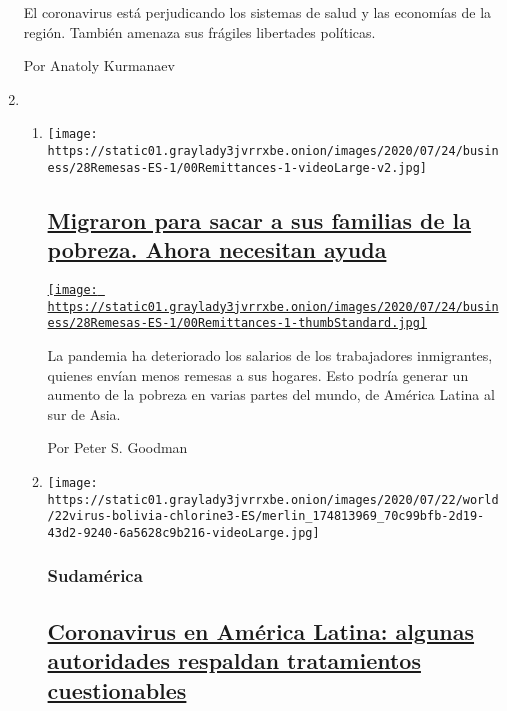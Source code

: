 \begin{enumerate}
  El coronavirus está perjudicando los sistemas de salud y las economías
  de la región. También amenaza sus frágiles libertades políticas.

  Por Anatoly Kurmanaev
\item
  \begin{enumerate}
  \def\labelenumii{\arabic{enumii}.}
  \item
    \texttt{[image: https://static01.graylady3jvrrxbe.onion/images/2020/07/24/business/28Remesas-ES-1/00Remittances-1-videoLarge-v2.jpg]}

    \hypertarget{migraron-para-sacar-a-sus-familias-de-la-pobreza-ahora-necesitan-ayuda}{%
    \subsection{\texorpdfstring{\href{/es/2020/07/28/espanol/mundo/remesas-coronavirus.html}{Migraron
    para sacar a sus familias de la pobreza. Ahora necesitan
    ayuda}}{Migraron para sacar a sus familias de la pobreza. Ahora necesitan ayuda}}\label{migraron-para-sacar-a-sus-familias-de-la-pobreza-ahora-necesitan-ayuda}}

    \href{/es/2020/07/28/espanol/mundo/remesas-coronavirus.html}{\texttt{[image: https://static01.graylady3jvrrxbe.onion/images/2020/07/24/business/28Remesas-ES-1/00Remittances-1-thumbStandard.jpg]}}

    La pandemia ha deteriorado los salarios de los trabajadores
    inmigrantes, quienes envían menos remesas a sus hogares. Esto podría
    generar un aumento de la pobreza en varias partes del mundo, de
    América Latina al sur de Asia.

    Por Peter S. Goodman
  \item
    \texttt{[image: https://static01.graylady3jvrrxbe.onion/images/2020/07/22/world/22virus-bolivia-chlorine3-ES/merlin\_174813969\_70c99bfb-2d19-43d2-9240-6a5628c9b216-videoLarge.jpg]}

    \hypertarget{sudamuxe9rica}{%
    \subsubsection{Sudamérica}\label{sudamuxe9rica}}

    \hypertarget{coronavirus-en-amuxe9rica-latina-algunas-autoridades-respaldan-tratamientos-cuestionables}{%
    \subsection{\texorpdfstring{\href{/es/2020/07/23/espanol/america-latina/bolivia-cloro-coronavirus-ivermectina.html}{Coronavirus
    en América Latina: algunas autoridades respaldan tratamientos
    cuestionables}}{Coronavirus en América Latina: algunas autoridades respaldan tratamientos cuestionables}}\label{coronavirus-en-amuxe9rica-latina-algunas-autoridades-respaldan-tratamientos-cuestionables}}


\end{enumerate}
\end{enumerate}
